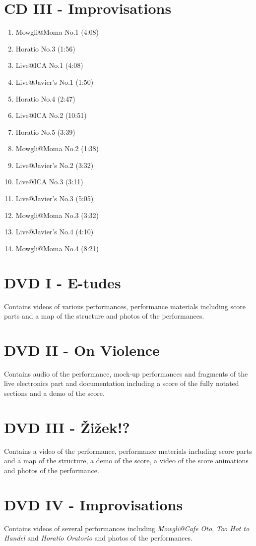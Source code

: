 \section*{CD III - Improvisations}

\begin{enumerate}
\item Mowgli@Moma No.1 (4:08)
\item Horatio No.3 (1:56)
\item Live@ICA No.1 (4:08)
\item Live@Javier's No.1 (1:50)
\item Horatio No.4 (2:47)
\item Live@ICA No.2 (10:51)
\item Horatio No.5 (3:39)
\item Mowgli@Moma No.2 (1:38)
\item Live@Javier's No.2 (3:32)
\item Live@ICA No.3 (3:11)
\item Live@Javier's No.3 (5:05)
\item Mowgli@Moma No.3 (3:32)
\item Live@Javier's No.4 (4:10)
\item Mowgli@Moma No.4 (8:21)
\end{enumerate}

\section*{DVD I - E-tudes}

Contains videos of various performances, performance materials including score parts and a map of the structure and photos of the performances.

\section*{DVD II - On Violence}

Contains audio of the performance, mock-up performances and fragments of the live electronics part and documentation including a score of the fully notated sections and a demo of the score.

\section*{DVD III - \v{Z}i\v{z}ek!?}

Contains a video of the performance, performance materials including score parts and a map of the structure, a demo of the score, a video of the score animations and photos of the performance.

\section*{DVD IV - Improvisations}

Contains videos of several performances including \emph{Mowgli@Cafe Oto}, \emph{Too Hot to Handel} and \emph{Horatio Oratorio} and photos of the performances.
